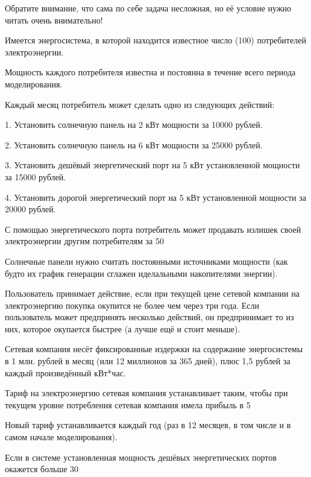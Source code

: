 
Обратите внимание, что сама по себе задача несложная, но её условие нужно читать очень внимательно!

Имеется энергосистема, в которой находится известное число (100) потребителей электроэнергии.

Мощность каждого потребителя известна и постоянна в течение всего периода моделирования.

Каждый месяц потребитель может сделать одно из следующих действий:

1. Установить солнечную панель на 2 кВт мощности за 10000 рублей.

2. Установить солнечную панель на 6 кВт мощности за 25000 рублей.

3. Установить дешёвый энергетический порт на 5 кВт установленной мощности за 15000 рублей.

4. Установить дорогой энергетический порт на 5 кВт установленной мощности за 20000 рублей.

С помощью энергетического порта потребитель может продавать излишек своей электроэнергии другим потребителям за 50%

Солнечные панели нужно считать постоянными источниками мощности (как будто их график генерации сглажен иделальными накопителями энергии).

Пользователь принимает действие, если при текущей цене сетевой компании на электроэнергию покупка окупится не более чем через три года. Если пользователь может предпринять несколько действий, он предпринимает то из них, которое окупается быстрее (а лучше ещё и стоит меньше).

Сетевая компания несёт фиксированные издержки на содержание энергосистемы в 1 млн. рублей в месяц (или 12 миллионов за 365 дней), плюс 1,5 рублей за каждый произведённый кВт*час.

Тариф на электроэнергию сетевая компания устанавливает таким, чтобы при текущем уровне потребления сетевая компания имела прибыль в 5%

Новый тариф устанавливается каждый год (раз в 12 месяцев, в том числе и в самом начале моделирования).

Если в системе установленная мощность дешёвых энергетических портов окажется больше 30%

